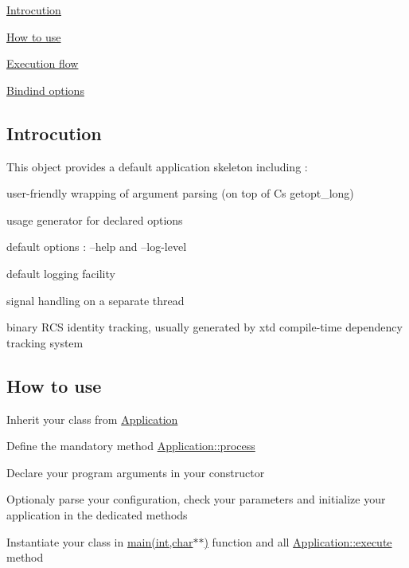 \begin{DoxyItemize}
\item \hyperlink{classxtd_1_1Application_sec_intro}{Introcution}
\item \hyperlink{classxtd_1_1Application_sec_howto}{How to use}
\item \hyperlink{classxtd_1_1Application_sec_execution_flow}{Execution flow}
\item \hyperlink{classxtd_1_1Application_sec_binding_options}{Bindind options}
\end{DoxyItemize}\hypertarget{classxtd_1_1Application_sec_intro}{}\subsection{Introcution}\label{classxtd_1_1Application_sec_intro}
This object provides a default application skeleton including \+:
\begin{DoxyItemize}
\item user-\/friendly wrapping of argument parsing (on top of C\textquotesingle{}s getopt\+\_\+long)
\item usage generator for declared options
\item default options \+: --help and --log-\/level
\item default logging facility
\item signal handling on a separate thread
\item binary R\+CS identity tracking, usually generated by xtd compile-\/time dependency tracking system
\end{DoxyItemize}\hypertarget{classxtd_1_1Application_sec_howto}{}\subsection{How to use}\label{classxtd_1_1Application_sec_howto}

\begin{DoxyEnumerate}
\item Inherit your class from \hyperlink{classxtd_1_1Application}{Application}
\item Define the mandatory method \hyperlink{classxtd_1_1Application_aef6043d47982bc1983a84e2c8a53f0cd}{Application\+::process}
\item Declare your program arguments in your constructor
\item Optionaly parse your configuration, check your parameters and initialize your application in the dedicated methods
\item Instantiate your class in \hyperlink{doc_2example_2Application_8hh_a6b77b2233054447db17959182b5fb02b}{main(int,char$\ast$$\ast$)} function and all \hyperlink{classxtd_1_1Application_ae9241351a9caefa4b96bc906d3db144c}{Application\+::execute} method
\end{DoxyEnumerate}

